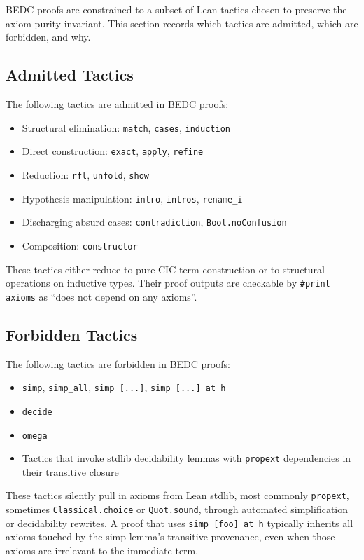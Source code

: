 BEDC proofs are constrained to a subset of Lean tactics chosen to preserve
the axiom-purity invariant. This section records which tactics are admitted,
which are forbidden, and why.

\subsection{Admitted Tactics}\label{subsec:admitted-tactics}

The following tactics are admitted in BEDC proofs:

\begin{itemize}
  \item Structural elimination: \texttt{match}, \texttt{cases}, \texttt{induction}
  \item Direct construction: \texttt{exact}, \texttt{apply}, \texttt{refine}
  \item Reduction: \texttt{rfl}, \texttt{unfold}, \texttt{show}
  \item Hypothesis manipulation: \texttt{intro}, \texttt{intros}, \texttt{rename\_i}
  \item Discharging absurd cases: \texttt{contradiction}, \texttt{Bool.noConfusion}
  \item Composition: \texttt{constructor}
\end{itemize}

These tactics either reduce to pure CIC term construction or to structural
operations on inductive types. Their proof outputs are checkable by
\texttt{\#print axioms} as ``does not depend on any axioms''.

\subsection{Forbidden Tactics}\label{subsec:forbidden-tactics}

The following tactics are forbidden in BEDC proofs:

\begin{itemize}
  \item \texttt{simp}, \texttt{simp\_all}, \texttt{simp [...]}, \texttt{simp [...] at h}
  \item \texttt{decide}
  \item \texttt{omega}
  \item Tactics that invoke stdlib decidability lemmas with \texttt{propext}
    dependencies in their transitive closure
\end{itemize}

These tactics silently pull in axioms from Lean stdlib, most commonly
\texttt{propext}, sometimes \texttt{Classical.choice} or \texttt{Quot.sound},
through automated simplification or decidability rewrites. A proof
that uses \texttt{simp [foo] at h} typically inherits all axioms touched
by the simp lemma's transitive provenance, even when those axioms are
irrelevant to the immediate term.

